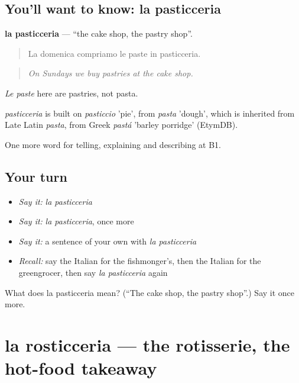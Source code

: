 \subsection*{You'll want to know: la pasticceria}
\textbf{la pasticceria} — \textquotedblleft{}the cake shop, the pastry shop\textquotedblright{}.

\begin{quote}
La domenica compriamo le paste in pasticceria.
\end{quote}

\begin{quote}
\emph{On Sundays we buy pastries at the cake shop.}
\end{quote}

\emph{Le paste} here are pastries, not pasta.

\begin{cousinweb}
\emph{pasticceria} is built on \emph{pasticcio} 'pie', from \emph{pasta} 'dough', which is inherited from Late Latin \emph{pasta}, from Greek \emph{pastá} 'barley porridge' (EtymDB).
\end{cousinweb}

\begin{grammarlens}[title={What you've built}]
One more word for telling, explaining and describing at B1.
\end{grammarlens}

\subsection*{Your turn}
\begin{itemize}
\raggedright
  \item \emph{Say it:} \emph{la pasticceria}
  \item \emph{Say it:} \emph{la pasticceria}, once more
  \item \emph{Say it:} a sentence of your own with \emph{la pasticceria}
  \item \emph{Recall:} say the Italian for the fishmonger's, then the Italian for the greengrocer, then say \emph{la pasticceria} again
\end{itemize}

\begin{tcolorbox}[breakable,colback=teal!4,colframe=teal!35!black,title={Before you move on}]
What does la pasticceria mean? (\textquotedblleft{}The cake shop, the pastry shop\textquotedblright{}.) Say it once more.
\end{tcolorbox}
\section[la rosticceria]{la rosticceria — the rotisserie, the hot-food takeaway}

